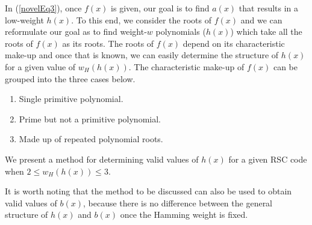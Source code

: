 
In (\ref{novelEq3}), once $f(x)$ is given, our goal is to find $a(x)$ that results in a low-weight $h(x)$. To this end, we consider the roots of $f(x)$ 
and we can reformulate our goal as to find weight-$w$ polynomials ($h(x)$) which take all the roots of $f(x)$ as its roots. The roots of $f(x)$ depend on its characteristic make-up and once that is known, we can easily determine the structure of $h(x)$ for a given value of $w_H(h(x))$. 
The characteristic make-up of $f(x)$ can be grouped into the three cases below. 
\begin{enumerate}
\item Single primitive polynomial.
\item Prime but not a primitive polynomial.
\item Made up of repeated polynomial roots.
\end{enumerate}
We present a method for determining valid values of $h(x)$ for a given RSC code when $2 \leq w_H(h(x))\leq 3$. 

It is worth noting that the method to be discussed can also be used to obtain valid values of $b(x)$, because there is no difference between the general structure of $h(x)$ and $b(x)$ once the Hamming weight is fixed. 